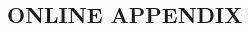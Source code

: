 \documentclass[10pt, letterpaper]{article}
\begin{document}
\begin{spacing}{1.4}
 \section*{\Huge ONLINE APPENDIX}











\end{spacing}
\end{document}
